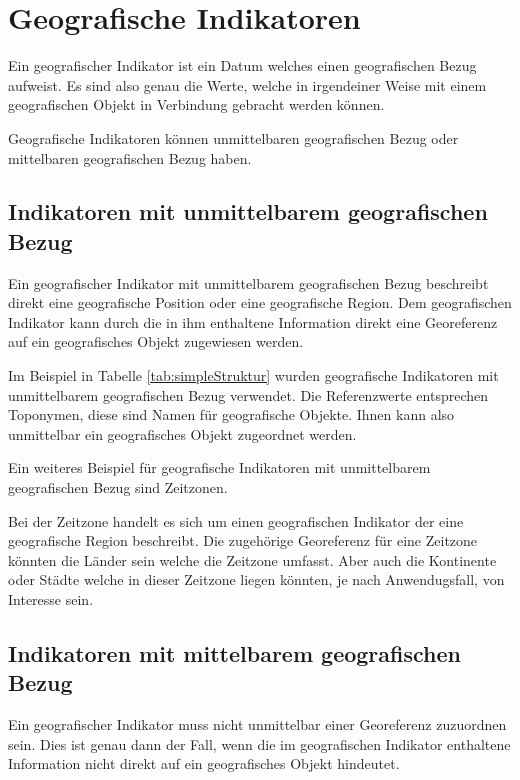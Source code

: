 	\section{Geografische Indikatoren} 

		Ein geografischer Indikator ist ein Datum welches einen geografischen Bezug aufweist.
		Es sind also genau die Werte, welche in irgendeiner Weise mit einem geografischen Objekt in Verbindung gebracht werden können.

		Geografische Indikatoren können unmittelbaren geografischen Bezug oder mittelbaren geografischen Bezug haben. 

			\subsection{Indikatoren mit unmittelbarem geografischen Bezug} \label{subsec:unmittelbareGeografischeIndikatoren} 

				Ein geografischer Indikator mit unmittelbarem geografischen Bezug beschreibt direkt eine geografische Position oder eine geografische Region.	
				Dem geografischen Indikator kann durch die in ihm enthaltene Information direkt eine Georeferenz auf ein geografisches Objekt zugewiesen werden. 

				Im Beispiel in Tabelle \ref{tab:simpleStruktur} wurden geografische Indikatoren mit unmittelbarem geografischen Bezug verwendet.  
				Die Referenzwerte entsprechen Toponymen, diese sind Namen für geografische Objekte. 
				Ihnen kann also unmittelbar ein geografisches Objekt zugeordnet werden.

				Ein weiteres Beispiel für geografische Indikatoren mit unmittelbarem geografischen Bezug sind Zeitzonen.

				Bei der Zeitzone handelt es sich um einen geografischen Indikator der eine geografische Region beschreibt.
				Die zugehörige Georeferenz für eine Zeitzone könnten die Länder sein welche die Zeitzone umfasst. 
				Aber auch die Kontinente oder Städte welche in dieser Zeitzone liegen könnten, je nach Anwendugsfall, von Interesse sein.

			\subsection{Indikatoren mit mittelbarem geografischen Bezug} 

				Ein geografischer Indikator muss nicht unmittelbar einer Georeferenz zuzuordnen sein.
				Dies ist genau dann der Fall, wenn die im geografischen Indikator enthaltene Information nicht direkt auf ein geografisches Objekt hindeutet.
				
